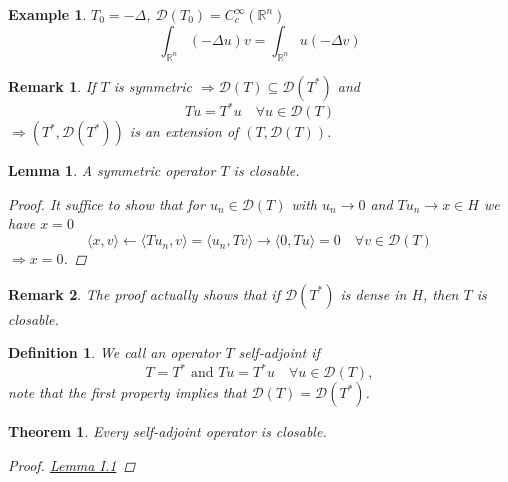 \documentclass[12pt]{extreport} %
\newcommand{\R}{\mathbb{R}}
\newcommand{\DO}[1]{\mathcal{D}\left( {#1} \right)}
\theoremstyle{named}
\theoremstyle{nnamed}
\theoremstyle{itshape}
\newtheorem{definition}{Definition}  \counterwithin{definition}{chapter}
\newtheorem{theorem}{Theorem}  \counterwithin{theorem}{chapter}
\newtheorem{lemma}{Lemma}  \counterwithin{lemma}{chapter}
\theoremstyle{normal}
\newtheorem*{example}{Example}
\newtheorem*{remark}{Remark}
\begin{document}
\begin{example}
	$T_0 = - \Delta$, $\DO{T_0} = C_c^{\infty}(\R^n)$
	$$ \int_{\R^n} \left( - \Delta u \right) v = \int_{\R^n} u \left( - \Delta v \right) $$	
\end{example}

\begin{remark}
	If $T$ is symmetric $\Rightarrow \DO{T} \subseteq \DO{T^*}$ and
	$$ T u = T^* u \quad \forall u \in \DO{T} $$
	$\Rightarrow \left( T^*, \DO{T^*} \right)$ is an extension of $\left( T, \DO{T} \right)$.
\end{remark}

\begin{lemma} \label{I.1:lmm}
	A symmetric operator $T$ is closable.
	
	\begin{proof}
		It suffice to show that for $u_n \in \DO{T}$ with $u_n \rightarrow 0$ and $ T u_n \rightarrow x \in H$ we have $x = 0$
		$$ \langle x,  v \rangle \leftarrow \langle T u_n, v \rangle = \langle u_n , T v \rangle \rightarrow \langle 0, T u \rangle = 0 \quad \forall v \in \DO{T}  $$
		$\Rightarrow x = 0$.
	\end{proof}
\end{lemma}

\begin{remark}
	The proof actually shows that if $\DO{T^*}$ is dense in $H$, then $T$ is closable.	
\end{remark}

\begin{definition}
	We call an operator $T$ self-adjoint if 
		$$ T = T^* \text{ and }  Tu = T^* u \quad \forall u \in \DO{T},  $$ %
	note that the first property implies that $\DO{T} = \DO{T^*}$.
\end{definition}

\begin{theorem} \label{thm:1.4}
	Every self-adjoint operator is closable.
	
	\begin{proof}
		\hyperref[I.1:lmm]{Lemma I.1}
	\end{proof}
\end{theorem}
\end{document}
